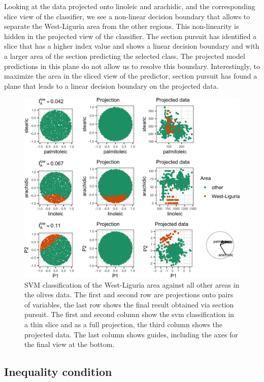 \documentclass[]{interact}
\theoremstyle{plain}%
\theoremstyle{definition}
\theoremstyle{remark}
\begin{document}
Looking at the data projected onto linoleic and arachidic, and the
corresponding slice view of the classifier, we see a non-linear decision
boundary that allows to separate the West-Liguria area from the other
regions. This non-linearity is hidden in the projected view of the
classifier. The section pursuit has identified a slice that has a higher
index value and shows a linear decision boundary and with a larger area
of the section predicting the selected class. The projected model
predictions in this plane do not allow us to resolve this boundary.
Interestingly, to maximize the area in the sliced view of the predictor,
section pursuit has found a plane that leads to a linear decision
boundary on the projected data.

\begin{figure}
\includegraphics[width=1\linewidth]{section_pursuit_files/figure-latex/olives-1} \caption{SVM classification of the West-Liguria area against all other areas in the olives data. The first and second row are projections onto pairs of variables, the last row shows the final result obtained via section pursuit. The first and second column show the svm classification in a thin slice and as a full projection, the third column shows the projected data. The last column shows guides, including the axes for the final view at the bottom.}\label{fig:olives}
\end{figure}

\hypertarget{inequality-condition}{%
\subsection{Inequality condition}\label{inequality-condition}}
\end{document}
